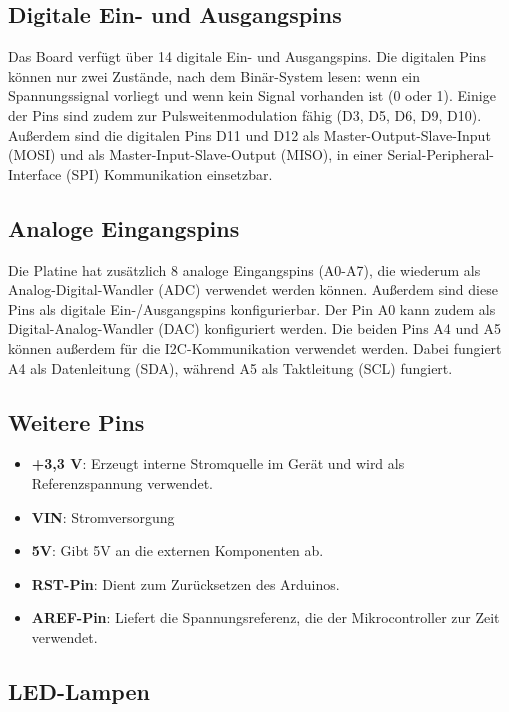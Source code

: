 \subsection{Digitale Ein- und Ausgangspins}

Das Board verfügt über 14 digitale Ein- und Ausgangspins. Die digitalen Pins können nur zwei Zustände, nach dem Binär-System lesen: wenn ein Spannungssignal vorliegt und wenn kein Signal vorhanden ist (0 oder 1). Einige der Pins sind zudem zur Pulsweitenmodulation fähig (D3, D5, D6, D9, D10). Außerdem sind die digitalen Pins D11 und D12 als Master-Output-Slave-Input (MOSI) und als Master-Input-Slave-Output (MISO), in einer Serial-Peripheral-Interface (SPI) Kommunikation einsetzbar.\cite{Ard.2024}

\subsection{Analoge Eingangspins}

Die Platine hat zusätzlich 8 analoge Eingangspins (A0-A7), die wiederum als Analog-Digital-Wandler (ADC) verwendet werden können. Außerdem sind diese Pins als digitale Ein-/Ausgangspins konfigurierbar. Der Pin A0 kann zudem als Digital-Analog-Wandler (DAC) konfiguriert werden. Die beiden Pins A4 und A5 können außerdem für die I2C-Kommunikation verwendet werden. Dabei fungiert A4 als Datenleitung (SDA), während A5 als Taktleitung (SCL) fungiert.\cite{Ard.2024}

\subsection{Weitere Pins}
	\begin{itemize}
		\item \textbf{+3,3 V}: Erzeugt interne Stromquelle im Gerät und wird als Referenzspannung verwendet.
		\item \textbf{VIN}: Stromversorgung
		\item \textbf{5V}: Gibt 5V an die externen Komponenten ab. 
		\item \textbf{RST-Pin}: Dient zum Zurücksetzen des Arduinos.
		\item \textbf{AREF-Pin}: Liefert die Spannungsreferenz, die der Mikrocontroller zur Zeit verwendet.
		\\ \cite{Ard.2024}
	\end{itemize}

\subsection{LED-Lampen}

